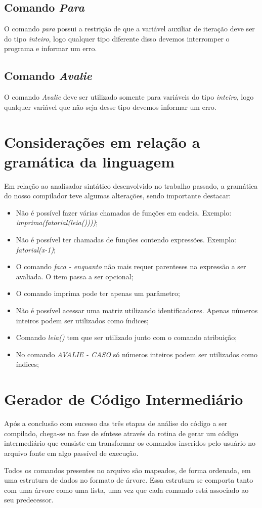 \documentclass[
12pt,				%
a4paper,			%
english,			%
french,				%
spanish,			%
brazil,				%
article
]{abntex2}
\begin{document}
\subsection{Comando \textit{Para}}
O comando \textit{para} possui a restrição de que a variável auxiliar de iteração deve ser do tipo \textit{inteiro}, logo qualquer tipo diferente disso devemos interromper o programa e informar um erro.

\subsection{Comando \textit{Avalie}}
O comando \textit{Avalie} deve ser utilizado somente para variáveis do tipo \textit{inteiro}, logo qualquer variável que não seja desse tipo devemos informar um erro.

\section{Considerações em relação a gramática da linguagem}
Em relação ao analisador sintático desenvolvido no trabalho passado, a gramática do nosso compilador teve algumas alterações, sendo importante destacar:

\begin{itemize}
	\item Não é possível fazer várias chamadas de funções em cadeia. Exemplo: \textit{imprima(fatorial(leia())))};
	\item Não é possível ter chamadas de funções contendo expressões. Exemplo: \textit{fatorial(x-1)};
	\item O comando \textit{faca - enquanto} não mais requer parenteses na expressão a ser avaliada. O item passa a ser opcional;
	\item O comando imprima pode ter apenas um parâmetro;
	\item Não é possível acessar uma matriz utilizando identificadores. Apenas números inteiros podem ser utilizados como índices;
	\item Comando \textit{leia()} tem que ser utilizado junto com o comando atribuição;
	\item No comando \textit{AVALIE - CASO} só números inteiros podem ser utilizados como índices;
\end{itemize}

\section{Gerador de Código Intermediário}

Após a conclusão com sucesso das três etapas de análise do código a ser compilado, chega-se na fase de síntese através da rotina de gerar um código intermediário que consiste em transformar os comandos inseridos pelo usuário no arquivo fonte em algo passível de execução.

Todos os comandos presentes no arquivo são mapeados, de forma ordenada, em uma estrutura de dados no formato de árvore. Essa estrutura se comporta tanto com uma árvore como uma lista, uma vez que cada comando está associado ao seu predecessor.
\end{document}
